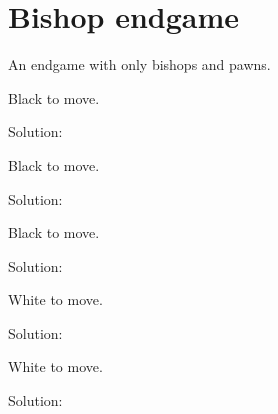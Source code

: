 \documentclass{book}
\begin{document}
\section{Bishop endgame}
An endgame with only bishops and pawns.\begin{multicols}{2} 
\begin{samepage} 
\newgame 


 
\showboard
 
 Black to move. 
 
Solution: 
 
\end{samepage}\begin{samepage} 
\newgame 


 
\showboard
 
 Black to move. 
 
Solution: 
 
\end{samepage}\begin{samepage} 
\newgame 


 
\showboard
 
 Black to move. 
 
Solution: 
 
\end{samepage}\begin{samepage} 
\newgame 


 
\showboard
 
 White to move. 
 
Solution: 
 
\end{samepage}\begin{samepage} 
\newgame 


 
\showboard
 
 White to move. 
 
Solution: 
 
\end{samepage}\begin{samepage} 
\newgame 


\end{samepage}
\end{multicols}
\end{document}
